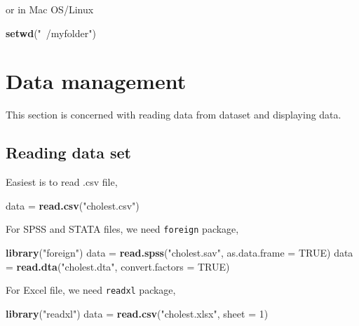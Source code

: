 \documentclass[]{book}
\newenvironment{Shaded}{\begin{snugshade}}{\end{snugshade}}
\newcommand{\KeywordTok}[1]{\textcolor[rgb]{0.13,0.29,0.53}{\textbf{{#1}}}}
\newcommand{\DataTypeTok}[1]{\textcolor[rgb]{0.13,0.29,0.53}{{#1}}}
\newcommand{\DecValTok}[1]{\textcolor[rgb]{0.00,0.00,0.81}{{#1}}}
\newcommand{\StringTok}[1]{\textcolor[rgb]{0.31,0.60,0.02}{{#1}}}
\newcommand{\OtherTok}[1]{\textcolor[rgb]{0.56,0.35,0.01}{{#1}}}
\newcommand{\NormalTok}[1]{{#1}}
\theoremstyle{definition}
\theoremstyle{definition}
\theoremstyle{remark}
\begin{document}
or in Mac OS/Linux

\begin{Shaded}
\begin{Highlighting}[]
\KeywordTok{setwd}\NormalTok{(}\StringTok{"~/myfolder"}\NormalTok{)}
\end{Highlighting}
\end{Shaded}

\section{Data management}\label{data-management}

This section is concerned with reading data from dataset and displaying
data.

\subsection{Reading data set}\label{reading-data-set}

Easiest is to read .csv file,

\begin{Shaded}
\begin{Highlighting}[]
\NormalTok{data =}\StringTok{ }\KeywordTok{read.csv}\NormalTok{(}\StringTok{"cholest.csv"}\NormalTok{)}
\end{Highlighting}
\end{Shaded}

For SPSS and STATA files, we need \texttt{foreign} package,

\begin{Shaded}
\begin{Highlighting}[]
\KeywordTok{library}\NormalTok{(}\StringTok{"foreign"}\NormalTok{)}
\NormalTok{data =}\StringTok{ }\KeywordTok{read.spss}\NormalTok{(}\StringTok{"cholest.sav"}\NormalTok{, }\DataTypeTok{as.data.frame =} \OtherTok{TRUE}\NormalTok{)}
\NormalTok{data =}\StringTok{ }\KeywordTok{read.dta}\NormalTok{(}\StringTok{"cholest.dta"}\NormalTok{, }\DataTypeTok{convert.factors =} \OtherTok{TRUE}\NormalTok{)}
\end{Highlighting}
\end{Shaded}

For Excel file, we need \texttt{readxl} package,

\begin{Shaded}
\begin{Highlighting}[]
\KeywordTok{library}\NormalTok{(}\StringTok{"readxl"}\NormalTok{)}
\NormalTok{data =}\StringTok{ }\KeywordTok{read.csv}\NormalTok{(}\StringTok{"cholest.xlsx"}\NormalTok{, }\DataTypeTok{sheet =} \DecValTok{1}\NormalTok{)}
\end{Highlighting}
\end{Shaded}
\end{document}

